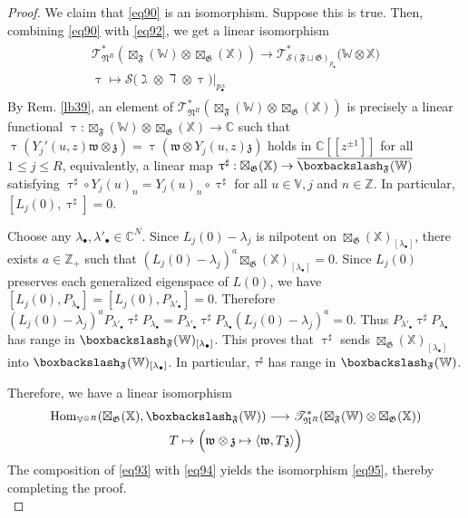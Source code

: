\documentclass[11pt,b5paper,notitlepage]{article}
\theoremstyle{definition}
\theoremstyle{plain}
\newcommand{\fk}{\mathfrak}
\newcommand{\ovl}{\overline}
\newcommand{\Hom}{\mathrm{Hom}}
\newcommand{\blt}{\bullet}
\newcommand{\Vbb}{\mathbb V}
\newcommand{\Xbb}{\mathbb X}
\newcommand{\Wbb}{\mathbb W}
\newcommand{\Cbb}{\mathbb C}
\newcommand{\Zbb}{\mathbb Z}
\newcommand{\<}{\left\langle}
\renewcommand{\>}{\right\rangle}
\newcommand{\ST}{\mathscr{T}}
\newcommand{\MS}{\mathcal{S}}
\newcommand{\bk}[1]{\langle {#1}\rangle}
\newcommand{\bbs}{\boxbackslash}
\newcommand{\fn}{\mathfrak{N}}
\newcommand{\ff}{\mathfrak{F}}
\newcommand{\fg}{\mathfrak{G}}
\numberwithin{equation}{section}
\begin{document}
\begin{proof}
We claim that \eqref{eq90} is an isomorphism. Suppose this is true. Then, combining \eqref{eq90} with \eqref{eq92}, we get a linear isomorphism
\begin{gather}\label{eq93}
\begin{gathered}
\ST^*_{\fn^R}(\boxtimes_\ff(\Wbb)\otimes\boxtimes_\fg(\Xbb))\longrightarrow\ST^*_{\MS(\ff\sqcup\fg)_{p_\blt}}\big(\Wbb\otimes\Xbb\big)\\
\uptau\mapsto \MS\big(\gimel\otimes\daleth\otimes\uptau\big)\big|_{p^\pm_\blt}
\end{gathered}
\end{gather}
By Rem. \ref{lb39}, an element of $\ST^*_{\fn^R}(\boxtimes_\ff(\Wbb)\otimes\boxtimes_\fg(\Xbb))$ is precisely a linear functional $\uptau:\boxtimes_\ff(\Wbb)\otimes\boxtimes_\fg(\Xbb)\rightarrow\Cbb$ such that $\uptau(Y_j'(u,z)\fk w\otimes\fk z)=\uptau(\fk w\otimes Y_j(u,z)\fk z)$ holds in $\Cbb[[z^{\pm1}]]$ for all $1\leq j\leq R$, equivalently, a linear map $\uptau^\sharp:\boxtimes_\fg(\Xbb)\rightarrow \ovl{\bbs_\ff(\Wbb)}$ satisfying $\uptau^\sharp\circ Y_j(u)_n=Y_j(u)_n\circ\uptau^\sharp$ for all $u\in\Vbb,j$ and $n\in\Zbb$. In particular, $[L_j(0),\uptau^\sharp]=0$. 

Choose any $\lambda_\blt,\lambda'_\blt\in\Cbb^N$. Since $L_j(0)-\lambda_j$ is nilpotent on $\boxtimes_\fg(\Xbb)_{[\lambda_\blt]}$, there exists $a\in\Zbb_+$ such that $(L_j(0)-\lambda_j)^a\boxtimes_\fg(\Xbb)_{[\lambda_\blt]}=0$. Since $L_j(0)$ preserves each generalized eigenspace of $L(0)$, we have $[L_j(0),P_{\lambda_\blt}]=[L_j(0),P_{\lambda'_\blt}]=0$. Therefore $(L_j(0)-\lambda_j)^a P_{\lambda'_\blt}\uptau^\sharp P_{\lambda_\blt}=P_{\lambda'_\blt}\uptau^\sharp P_{\lambda_\blt}(L_j(0)-\lambda_j)^a=0$. Thus $P_{\lambda'_\blt}\uptau^\sharp P_{\lambda_\blt}$ has range in $\bbs_\ff(\Wbb)_{[\lambda_\blt]}$. This proves that $\uptau^\sharp$ sends $\boxtimes_\fg(\Xbb)_{[\lambda_\blt]}$ into $\bbs_\ff(\Wbb)_{[\lambda_\blt]}$. In particular, $\tau^\sharp$ has range in $\bbs_\ff(\Wbb)$.


Therefore, we have a linear isomorphism
\begin{gather}\label{eq94}
\begin{gathered}
\Hom_{\Vbb^{\otimes R}}(\boxtimes_\fg(\Xbb),\bbs_\ff(\Wbb))\longrightarrow\ST^*_{\fn^R}(\boxtimes_\ff(\Wbb)\otimes\boxtimes_\fg(\Xbb))\\
T\mapsto \Big(\fk w\otimes\fk z\mapsto\bk{\fk w,T\fk z}  \Big)
\end{gathered}
\end{gather}
The composition of \eqref{eq93} with \eqref{eq94} yields the isomorphism \eqref{eq95}, thereby completing the proof.\\[-1ex]




\end{proof}
\end{document}
